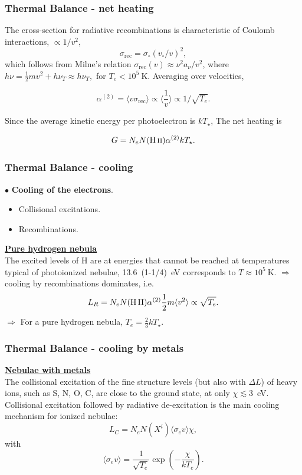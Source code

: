 \begin{frame}\frametitle{Thermal Balance - net heating}


The cross-section for radiative recombinations is characteristic of
Coulomb interactions,  $\propto 1/v^2$, 
\[
\sigma_\mathrm{rec} = \sigma_\circ (v_\circ/v)^2, 
\]
which follows from Milne's relation $\sigma_\mathrm{rec}(v) \approx \nu^2
a_\nu / v^2$, where $ h \nu = \frac{1}{2} m v^2 + h \nu_T \approx h
\nu_T,$ for $T_e < 10^5~$K.   Averaging over velocities, 

\[
\alpha^{(2)} =  \langle v \sigma_\mathrm{rec} \rangle \propto
 \langle  \frac{1}{v}   \rangle \propto 1/\sqrt{T_e}.
\]

Since the average kinetic energy per photoelectron is $kT_\star$, The
net heating is 

\[
G =  N_e N(\text{H\,{\sc ii}}) \alpha^{(2)} kT_\star .
\]

\end{frame}
\begin{frame}\frametitle{Thermal Balance - cooling}

$\bullet$ {\bf \large Cooling of the electrons}.

\begin{itemize}
\item Collisional excitations.
\item Recombinations.
\end{itemize}



\underline{\bf Pure hydrogen nebula}\\

The excited levels of H are at energies that cannot be reached at
temperatures typical of photoionized nebulae, 13.6~(1-1/4)~eV
corresponds to  $T\approx 10^5~$K. $\Rightarrow$ cooling by
recombinations dominates, i.e. \[ L_R = N_e N(\mathrm{H\,{\small II}}) \alpha^{(2)} \frac{1}{2} m \langle v^2 \rangle \propto
\sqrt{T_e}.
\]
$\Rightarrow$ For a pure hydrogen nebula, $T_e = \frac{2}{3}
k T_\star$. 


\end{frame}
\begin{frame}\frametitle{Thermal Balance - cooling by metals}


\underline{\bf Nebulae with metals}\\

The collisional excitation of the fine structure levels (but also with
$\Delta L$) of heavy ions, such as S, N, O, C, are close to the ground
state, at only $\chi
\lesssim 3$~eV. Collisional excitation followed by radiative
de-excitation is the main cooling mechanism for ionized nebulae:
\[
L_C = N_e N(X^i) \langle \sigma_e v \rangle  \chi, 
\]
with
\[
\langle \sigma_e v \rangle  =  \frac{1}{\sqrt{T_e}} \exp( - \frac{\chi}{kT_e}). \]


\end{frame}
